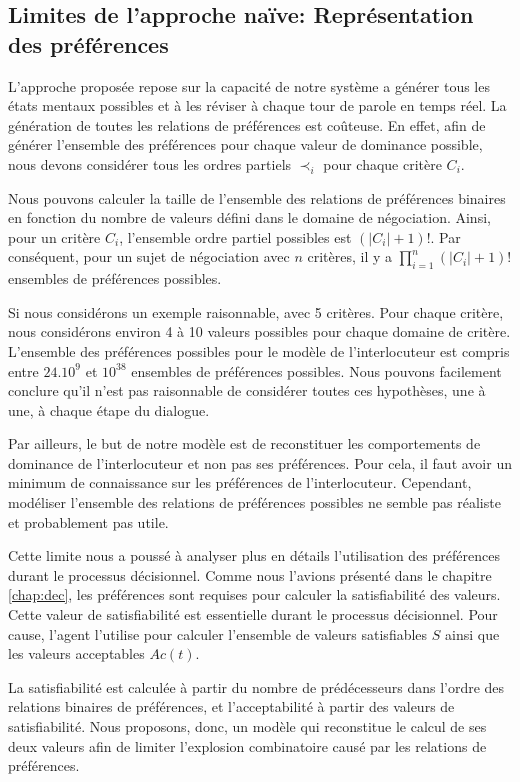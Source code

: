 \subsection{Limites de l'approche naïve: Représentation des préférences}

L'approche proposée repose sur la capacité de notre système a générer tous les états mentaux possibles et à les réviser à chaque tour de parole en temps réel. La génération de toutes les relations de préférences est coûteuse. En effet, afin de générer l'ensemble des préférences pour chaque valeur de dominance possible, nous devons considérer tous les ordres partiels $\prec_i$ pour chaque critère $C_i$. 

Nous pouvons calculer la taille de l'ensemble des relations de préférences binaires en fonction du nombre de valeurs défini dans le domaine de négociation. Ainsi, pour un critère $C_i$, l'ensemble ordre partiel possibles est  $(|C_i|+1)! $. Par conséquent, pour un sujet de négociation avec $n$ critères, il y a $\prod_{i=1}^n (|C_i|+1)!$ ensembles de préférences possibles.


Si nous considérons un exemple raisonnable, avec 5 critères. Pour chaque critère, nous considérons environ 4 à 10 valeurs possibles pour chaque domaine de critère. L'ensemble des préférences possibles pour le modèle de l'interlocuteur est compris entre $ 24.10 ^ 9 $ et $ 10 ^ {38} $ ensembles de préférences possibles.
Nous pouvons facilement conclure qu'il n'est pas raisonnable de considérer toutes ces hypothèses, une à une, à chaque étape du dialogue.

Par ailleurs, le but de notre modèle est de reconstituer les comportements de dominance de l'interlocuteur et non pas ses préférences. Pour cela, il faut avoir un minimum de connaissance sur les préférences de l'interlocuteur. Cependant, modéliser l'ensemble des relations de préférences possibles ne semble pas réaliste et probablement pas utile.

Cette limite nous a poussé à analyser plus en détails l'utilisation des préférences durant le processus décisionnel. Comme nous l'avions présenté dans le chapitre \ref{chap:dec}, les préférences sont requises pour calculer la satisfiabilité des valeurs. Cette valeur de satisfiabilité est essentielle durant le processus décisionnel. Pour cause, l'agent l'utilise pour calculer l'ensemble de valeurs satisfiables $S$ ainsi que les valeurs acceptables $Ac(t)$.

La satisfiabilité est calculée à partir du nombre de prédécesseurs dans l'ordre des relations binaires de préférences, et l'acceptabilité à partir des valeurs de satisfiabilité. Nous proposons, donc, un modèle qui reconstitue le calcul de ses deux valeurs afin de limiter l'explosion combinatoire causé par les relations de préférences. 

